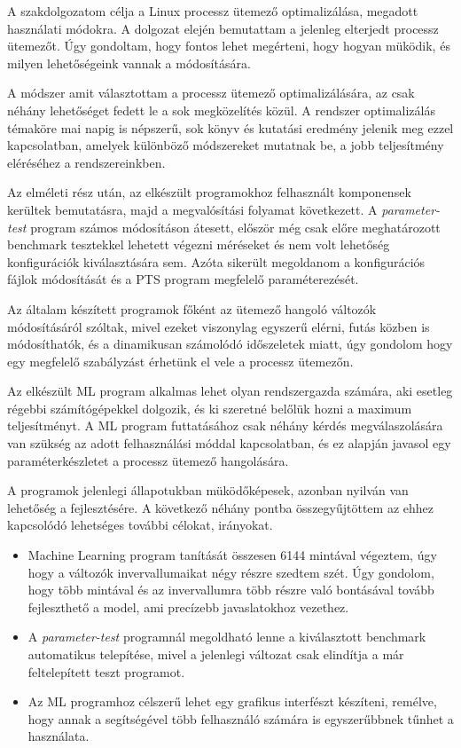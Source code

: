 
A szakdolgozatom célja a Linux processz ütemező optimalizálása, megadott használati módokra.
A dolgozat elején bemutattam a jelenleg elterjedt processz ütemezőt. Úgy gondoltam, hogy fontos lehet megérteni, hogy hogyan müködik, és milyen lehetőségeink vannak a módosítására.

A módszer amit választottam a processz ütemező optimalizálására, az csak néhány lehetőséget fedett le a sok megközelítés közül. A rendszer optimalizálás témaköre mai napig is népszerű, sok könyv és kutatási eredmény jelenik meg ezzel kapcsolatban, amelyek különböző módszereket mutatnak be, a jobb teljesítmény eléréséhez a rendszereinkben.

Az elméleti rész után, az elkészült programokhoz felhasznált komponensek kerültek bemutatásra, majd a megvalósítási folyamat következett. A \textit{parameter-test} program számos módosításon átesett, először még csak előre meghatározott benchmark tesztekkel lehetett végezni méréseket és nem volt lehetőség konfigurációk kiválasztására sem. Azóta sikerült megoldanom a konfigurációs fájlok módosítását és a PTS program megfelelő paraméterezését. 

Az általam készített programok főként az ütemező hangoló változók módosításáról szóltak, mivel ezeket viszonylag egyszerű elérni, futás közben is módosíthatók, és a dinamikusan számolódó időszeletek miatt, úgy gondolom hogy egy megfelelő szabályzást érhetünk el vele a processz ütemezőn.

Az elkészült ML program alkalmas lehet olyan rendszergazda számára, aki esetleg régebbi számítógépekkel dolgozik, és ki szeretné belőlük hozni a maximum teljesítményt.
A ML program futtatásához csak néhány kérdés megválaszolására van szükség az adott felhasználási móddal kapcsolatban, és ez alapján javasol egy paraméterkészletet a processz ütemező hangolására.

A programok jelenlegi állapotukban müködőképesek, azonban nyilván van lehetőség a fejlesztésére. A következő néhány pontba összegyűjtöttem az ehhez kapcsolódó lehetséges további célokat, irányokat.
\begin{itemize}
\item Machine Learning program tanítását összesen 6144 mintával végeztem, úgy hogy a változók invervallumaikat négy részre szedtem szét. Úgy gondolom, hogy több mintával és az invervallumra több részre való bontásával tovább fejleszthető a model, ami precízebb javaslatokhoz vezethez.
\item A \textit{parameter-test} programnál megoldható lenne a kiválasztott benchmark automatikus telepítése, mivel a jelenlegi változat csak elindítja a már feltelepített teszt programot.
\item Az ML programhoz célszerű lehet egy grafikus interfészt készíteni, remélve, hogy annak a segítségével több felhasználó számára  is egyszerűbbnek tűnhet a használata.
\end{itemize}
